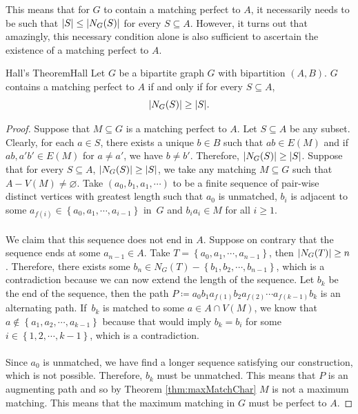 \documentclass[math]{amznotes}
\theoremstyle{remark}
\begin{document}
This means that for $G$ to contain a matching perfect to $A$, it necessarily needs to be such that ${\left\lvert {S} \right\rvert} \leq {\left\lvert {N_G(S)} \right\rvert}$ for every $S \subseteq A$. However, it turns out that amazingly, this necessary condition alone is also sufficient to ascertain the existence of a matching perfect to $A$.
\begin{thmbox}{Hall's Theorem}{Hall}
    Let $G$ be a bipartite graph $G$ with bipartition $(A, B)$. $G$ contains a matching perfect to $A$ if and only if for every $S \subseteq A$,
    \begin{equation*}
        {\left\lvert {N_G(S)} \right\rvert} \geq {\left\lvert {S} \right\rvert}.
    \end{equation*}
    \tcblower
    \begin{proof}
        Suppose that $M \subseteq G$ is a matching perfect to $A$. Let $S \subseteq A$ be any subset. Clearly, for each $a \in S$, there exists a unique $b \in B$ such that $ab \in E(M)$ and if~$ab, a'b' \in E(M)$ for $a \neq a'$, we have $b \neq b'$. Therefore, ${\left\lvert {N_G(S)} \right\rvert} \geq {\left\lvert {S} \right\rvert}$. Suppose that for every $S \subseteq A$, ${\left\lvert {N_G(S)} \right\rvert} \geq {\left\lvert {S} \right\rvert}$, we take any matching $M \subseteq G$ such that $A - V(M) \neq \varnothing$. Take $(a_0, b_1, a_1, \cdots)$ to be a finite sequence of pair-wise distinct vertices with greatest length such that $a_0$ is unmatched, $b_i$ is adjacent to some $a_{f(i)} \in \left\{a_0, a_1, \cdots, a_{i - 1}\right\}$ in~$G$ and $b_ia_i \in M$ for all $i \geq 1$.
        \\\\
        We claim that this sequence does not end in $A$. Suppose on contrary that the sequence ends at some $a_{n - 1} \in A$. Take $T = \left\{a_0, a_1, \cdots, a_{n - 1}\right\}$, then ${\left\lvert {N_G(T)} \right\rvert} \geq n$. Therefore, there exists some $b_n \in N_G(T) - \left\{b_1, b_2, \cdots, b_{n - 1}\right\}$, which is a contradiction because we can now extend the length of the sequence. Let $b_k$ be the end of the sequence, then the path $P \coloneqq a_0b_1a_{f(1)}b_2a_{f(2)}\cdots a_{f(k - 1)}b_k$ is an alternating path. If~$b_k$ is matched to some $a \in A \cap V(M)$, we know that $a \notin \left\{a_1, a_2,\cdots, a_{k - 1}\right\}$ because that would imply $b_k = b_i$ for some $i \in \left\{1, 2, \cdots, k - 1\right\}$, which is a contradiction. 
        \\\\
        Since $a_0$ is unmatched, we have find a longer sequence satisfying our construction, which is not possible. Therefore, $b_k$ must be unmatched. This means that $P$ is an augmenting path and so by Theorem \ref{thm:maxMatchChar} $M$ is not a maximum matching. This means that the maximum matching in $G$ must be perfect to $A$.
    \end{proof}
\end{thmbox}
\end{document}
